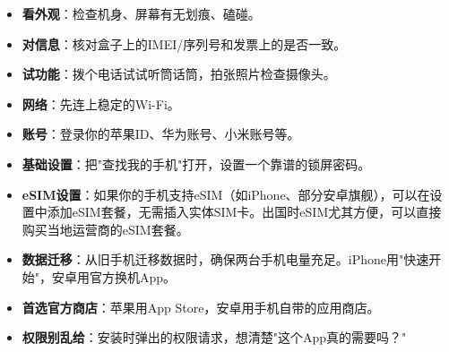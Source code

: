 

\begin{itemize}
  \item \textbf{看外观}：检查机身、屏幕有无划痕、磕碰。
  \item \textbf{对信息}：核对盒子上的IMEI/序列号和发票上的是否一致。
  \item \textbf{试功能}：拨个电话试试听筒话筒，拍张照片检查摄像头。
\end{itemize}


\begin{itemize}
  \item \textbf{网络}：先连上稳定的Wi-Fi。
  \item \textbf{账号}：登录你的苹果ID、华为账号、小米账号等。
  \item \textbf{基础设置}：把"查找我的手机"打开，设置一个靠谱的锁屏密码。
  \item \textbf{eSIM设置}：如果你的手机支持eSIM（如iPhone、部分安卓旗舰），可以在设置中添加eSIM套餐，无需插入实体SIM卡。出国时eSIM尤其方便，可以直接购买当地运营商的eSIM套餐。
  \item \textbf{数据迁移}：从旧手机迁移数据时，确保两台手机电量充足。iPhone用"快速开始"，安卓用官方换机App。
\end{itemize}


\begin{itemize}
  \item \textbf{首选官方商店}：苹果用App Store，安卓用手机自带的应用商店。
  \item \textbf{权限别乱给}：安装时弹出的权限请求，想清楚"这个App真的需要吗？"
\end{itemize}
